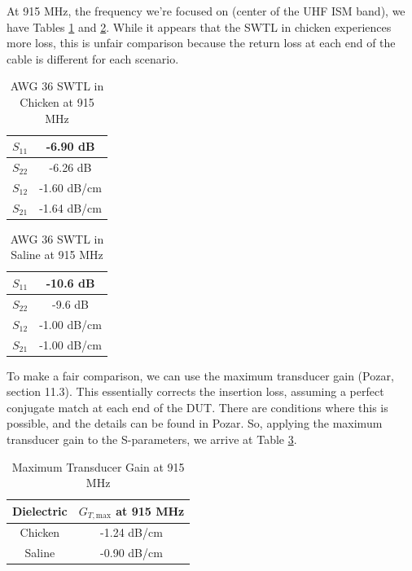 \documentclass[12pt,onecolumn,titlepage]{article}
\begin{document}
At 915 MHz, the frequency we're focused on (center of the UHF ISM band), we have Tables \ref{tab:AWG36_SWTL_chicken} and \ref{tab:AWG36_SWTL_saline}. While it appears that the SWTL in chicken experiences more loss, this is unfair comparison because the return loss at each end of the cable is different for each scenario.



\begin{table}[h!]
\centering
	\caption{AWG 36 SWTL in Chicken at 915 MHz}
	\vspace{10pt}
	\begin{tabular}{| c | c |}
	\hline
	$S_{11}$ & -6.90 dB \\ \hline
	$S_{22}$ & -6.26 dB \\ \hline
	$S_{12}$ & -1.60 dB/cm \\ \hline
	$S_{21}$ & -1.64 dB/cm \\ \hline
	\end{tabular}
\label{tab:AWG36_SWTL_chicken}
\end{table}


\begin{table}[h!]
\centering
	\caption{AWG 36 SWTL in Saline at 915 MHz}
	\vspace{10pt}
	\begin{tabular}{| c | c |}
	\hline
	$S_{11}$ & -10.6 dB \\ \hline
	$S_{22}$ & -9.6 dB \\ \hline
	$S_{12}$ & -1.00 dB/cm \\ \hline
	$S_{21}$ & -1.00 dB/cm \\ \hline
	\end{tabular}
\label{tab:AWG36_SWTL_saline}
\end{table}



To make a fair comparison, we can use the maximum transducer gain (Pozar, section 11.3). This essentially corrects the insertion loss, assuming a perfect conjugate match at each end of the DUT. There are conditions where this is possible, and the details can be found in Pozar. So, applying the maximum transducer gain to the S-parameters, we arrive at Table \ref{tab:AWG36_SWTL_Gtmax}. 



\begin{table}[h!]
\centering
	\caption{Maximum Transducer Gain at 915 MHz}
	\vspace{10pt}
	\begin{tabular}{| c | c |}
	\hline
	Dielectric & $G_{T,\text{max}}$ at 915 MHz \\ \hline
	Chicken & -1.24 dB/cm \\ \hline
	Saline & -0.90 dB/cm \\ \hline
	\end{tabular}
\label{tab:AWG36_SWTL_Gtmax}
\end{table}
\end{document}
